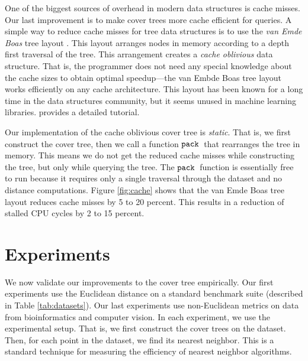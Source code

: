 \documentclass[thesis.tex]{subfiles}
\newcommand{\pack}{\ensuremath{\textnormal{\ttfamily pack}}}
\begin{document}
One of the biggest sources of overhead in modern data structures is cache misses.
Our last improvement is to make cover trees more cache efficient for queries.
A simple way to reduce cache misses for tree data structures is to use the \emph{van Emde Boas} tree layout
\citep{frigo1999}.
This layout arranges nodes in memory according to a depth first traversal of the tree.
This arrangement creates a \emph{cache oblivious} data structure.
That is, the programmer does not need any special knowledge about the cache sizes to obtain optimal speedup---the van Embde Boas tree layout works efficiently on any cache architecture.
This layout has been known for a long time in the data structures community, but it seems unused in machine learning libraries.
\citet{frigo1999} provides a detailed tutorial.

Our implementation of the cache oblivious cover tree is \emph{static}.
That is, we first construct the cover tree, then we call a function \pack~that rearranges the tree in memory.
This means we do not get the reduced cache misses while constructing the tree, but only while querying the tree.
The \pack\ function is essentially free to run because it requires only a single traversal through the dataset and no distance computations.
Figure \ref{fig:cache} shows that the van Emde Boas tree layout reduces cache misses by 5 to 20 percent.
This results in a reduction of stalled CPU cycles by 2 to 15 percent.


\section{Experiments}
\label{sec:experiments}

We now validate our improvements to the cover tree empirically.
Our first experiments use the Euclidean distance on a standard benchmark suite (described in Table \ref{tab:datasets}).
Our last experiments use non-Euclidean metrics on data from bioinformatics and computer vision.
In each experiment, we use the  experimental setup.
That is, we first construct the cover trees on the dataset.
Then, for each point in the dataset, we find its nearest neighbor.
This is a standard technique for measuring the efficiency of nearest neighbor algorithms.
\end{document}
